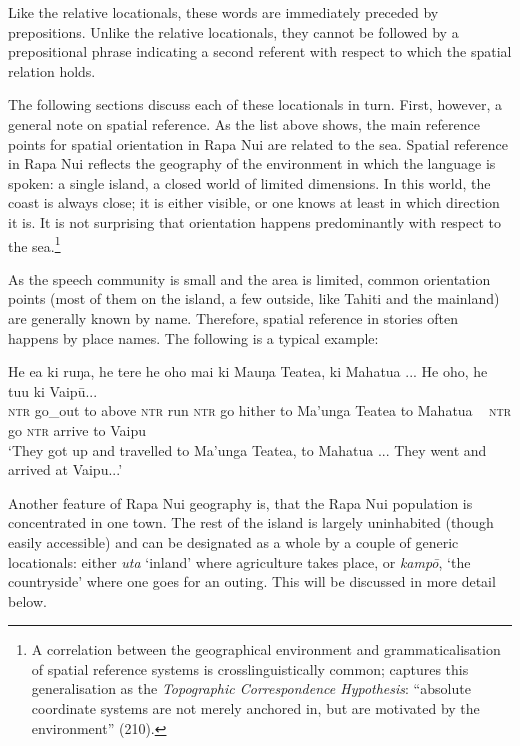 Like the relative locationals, these words are immediately preceded by prepositions. Unlike the relative locationals, they cannot be followed by a prepositional phrase indicating a second referent with respect to which the spatial relation holds.

The following sections discuss each of these locationals in turn. First, however, a general note on spatial reference. As the list above shows, the main reference points for spatial orientation in Rapa Nui are related to the sea. Spatial reference in Rapa Nui reflects the geography of the environment in which the language is spoken: a single island, a closed world of limited dimensions. In this world, the coast is always close; it is either visible, or one knows at least in which direction it is. It is not surprising that orientation happens predominantly with respect to the sea.\footnote{\label{fn:152}A correlation between the geographical environment and grammaticalisation of spatial reference systems is crosslinguistically common; \citet{Palmer2015} captures this generalisation as the \textit{\textup{Topographic Correspondence Hypothesis}}: “absolute coordinate systems are not merely anchored in, but are motivated by the environment” (210).} 

As the speech community is small and the area is limited, common orientation points (most of them on the island, a few outside, like Tahiti and the mainland) are generally known by name. Therefore, spatial reference in stories often happens by place names. The following is a typical example:

\ea\label{ex:3.158}
\gll He e{\ꞌ}a ki ruŋa, he tere he oho mai ki Ma{\ꞌ}uŋa Teatea, ki Mahatua ... He oho, he tu{\ꞌ}u ki Vaipū... \\
\textsc{ntr} go\_out to above \textsc{ntr} run \textsc{ntr} go hither to Ma’unga Teatea to Mahatua ~  \textsc{ntr} go \textsc{ntr} arrive to Vaipu \\

\glt
‘They got up and travelled to Ma’unga Teatea, to Mahatua ... They went and arrived at Vaipu...’ \textstyleExampleref{[Mtx-3-01.214–216]}
\z

  
Another feature of Rapa Nui geography is, that the Rapa Nui population is concentrated in one town. The rest of the island is largely uninhabited (though easily accessible) and can be designated as a whole by a couple of generic locationals: either \textit{{\ꞌ}uta} ‘inland’ where agriculture takes place, or \textit{kampō}, ‘the countryside’ where one goes for an outing. This will be discussed in more detail below.

